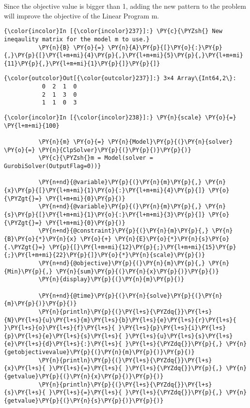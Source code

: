 Since the objective value is bigger than 1, adding the new pattern to
the problem will improve the objective of the Linear Program m.

    \begin{Verbatim}[commandchars=\\\{\}]
{\color{incolor}In [{\color{incolor}237}]:} \PY{c}{\PYZsh{} New ineqaulity matrix for the model m to use.}
          \PY{n}{B} \PY{o}{=} \PY{n}{A}\PY{p}{[}\PY{o}{:}\PY{p}{,}\PY{p}{[}\PY{l+m+mi}{4}\PY{p}{,}\PY{l+m+mi}{5}\PY{p}{,}\PY{l+m+mi}{11}\PY{p}{,}\PY{l+m+mi}{1}\PY{p}{]}\PY{p}{]}
\end{Verbatim}


\begin{Verbatim}[commandchars=\\\{\}]
{\color{outcolor}Out[{\color{outcolor}237}]:} 3×4 Array\{Int64,2\}:
           0  2  1  0
           2  1  3  0
           1  1  0  3
\end{Verbatim}
            
    \begin{Verbatim}[commandchars=\\\{\}]
{\color{incolor}In [{\color{incolor}238}]:} \PY{n}{scale} \PY{o}{=} \PY{l+m+mi}{100}
          
          \PY{n}{m} \PY{o}{=} \PY{n}{Model}\PY{p}{(}\PY{n}{solver} \PY{o}{=} \PY{n}{ClpSolver}\PY{p}{(}\PY{p}{)}\PY{p}{)}
          \PY{c}{\PYZsh{}m = Model(solver = GurobiSolver(OutputFlag=0))}
          
          \PY{n+nd}{@variable}\PY{p}{(}\PY{n}{m}\PY{p}{,} \PY{n}{x}\PY{p}{[}\PY{l+m+mi}{1}\PY{o}{:}\PY{l+m+mi}{4}\PY{p}{]} \PY{o}{\PYZgt{}=} \PY{l+m+mi}{0}\PY{p}{)}
          \PY{n+nd}{@variable}\PY{p}{(}\PY{n}{m}\PY{p}{,} \PY{n}{s}\PY{p}{[}\PY{l+m+mi}{1}\PY{o}{:}\PY{l+m+mi}{3}\PY{p}{]} \PY{o}{\PYZgt{}=} \PY{l+m+mi}{0}\PY{p}{)}
          \PY{n+nd}{@constraint}\PY{p}{(}\PY{n}{m}\PY{p}{,} \PY{n}{B}\PY{o}{*}\PY{n}{x} \PY{o}{+} \PY{n}{E}\PY{o}{*}\PY{n}{s}\PY{o}{.\PYZgt{}=} \PY{p}{[}\PY{l+m+mi}{12}\PY{p}{;}\PY{l+m+mi}{15}\PY{p}{;}\PY{l+m+mi}{22}\PY{p}{]}\PY{o}{*}\PY{n}{scale}\PY{p}{)}
          \PY{n+nd}{@objective}\PY{p}{(}\PY{n}{m}\PY{p}{,} \PY{n}{Min}\PY{p}{,} \PY{n}{sum}\PY{p}{(}\PY{n}{x}\PY{p}{)}\PY{p}{)}
          \PY{n}{display}\PY{p}{(}\PY{n}{m}\PY{p}{)}
          
          \PY{n+nd}{@time}\PY{p}{(}\PY{n}{solve}\PY{p}{(}\PY{n}{m}\PY{p}{)}\PY{p}{)}
          \PY{n}{println}\PY{p}{(}\PY{l+s}{\PYZdq{}}\PY{l+s}{N}\PY{l+s}{u}\PY{l+s}{m}\PY{l+s}{b}\PY{l+s}{e}\PY{l+s}{r}\PY{l+s}{ }\PY{l+s}{o}\PY{l+s}{f}\PY{l+s}{ }\PY{l+s}{p}\PY{l+s}{i}\PY{l+s}{p}\PY{l+s}{e}\PY{l+s}{s}\PY{l+s}{ }\PY{l+s}{u}\PY{l+s}{s}\PY{l+s}{e}\PY{l+s}{d}\PY{l+s}{:}\PY{l+s}{ }\PY{l+s}{\PYZdq{}}\PY{p}{,} \PY{n}{getobjectivevalue}\PY{p}{(}\PY{n}{m}\PY{p}{)}\PY{p}{)}
          \PY{n}{println}\PY{p}{(}\PY{l+s}{\PYZdq{}}\PY{l+s}{x}\PY{l+s}{ }\PY{l+s}{=}\PY{l+s}{ }\PY{l+s}{\PYZdq{}}\PY{p}{,} \PY{n}{getvalue}\PY{p}{(}\PY{n}{x}\PY{p}{)}\PY{p}{)}
          \PY{n}{println}\PY{p}{(}\PY{l+s}{\PYZdq{}}\PY{l+s}{s}\PY{l+s}{ }\PY{l+s}{=}\PY{l+s}{ }\PY{l+s}{\PYZdq{}}\PY{p}{,} \PY{n}{getvalue}\PY{p}{(}\PY{n}{s}\PY{p}{)}\PY{p}{)}
\end{Verbatim}



